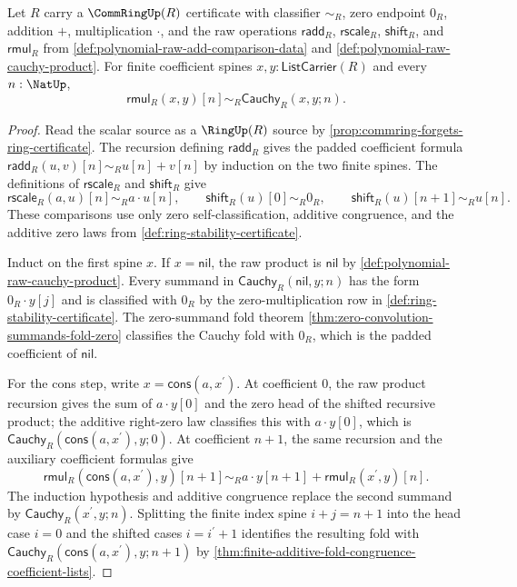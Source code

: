 \begin{lemma}
\label{lem:raw-cauchy-product-coefficient-formula}
Let $R$ carry a $\CommRingUp(R)$ certificate with classifier $\sim_R$, zero endpoint $0_R$, addition $+$, multiplication $\cdot$, and the raw operations $\mathsf{radd}_R$, $\mathsf{rscale}_R$, $\mathsf{shift}_R$, and $\mathsf{rmul}_R$ from \autoref{def:polynomial-raw-add-comparison-data} and \autoref{def:polynomial-raw-cauchy-product}. For finite coefficient spines $x,y:\mathsf{ListCarrier}(R)$ and every $n:\NatUp$,
$$
\mathsf{rmul}_R(x,y)[n]\sim_R\mathsf{Cauchy}_R(x,y;n).
$$
\end{lemma}
\begin{proof}
Read the scalar source as a $\RingUp(R)$ source by \autoref{prop:commring-forgets-ring-certificate}. The recursion defining $\mathsf{radd}_R$ gives the padded coefficient formula $\mathsf{radd}_R(u,v)[n]\sim_Ru[n]+v[n]$ by induction on the two finite spines. The definitions of $\mathsf{rscale}_R$ and $\mathsf{shift}_R$ give
$$
\mathsf{rscale}_R(a,u)[n]\sim_Ra\cdot u[n],\qquad \mathsf{shift}_R(u)[0]\sim_R0_R,\qquad \mathsf{shift}_R(u)[n+1]\sim_Ru[n].
$$
These comparisons use only zero self-classification, additive congruence, and the additive zero laws from \autoref{def:ring-stability-certificate}.

Induct on the first spine $x$. If $x=\mathsf{nil}$, the raw product is $\mathsf{nil}$ by \autoref{def:polynomial-raw-cauchy-product}. Every summand in $\mathsf{Cauchy}_R(\mathsf{nil},y;n)$ has the form $0_R\cdot y[j]$ and is classified with $0_R$ by the zero-multiplication row in \autoref{def:ring-stability-certificate}. The zero-summand fold theorem \autoref{thm:zero-convolution-summands-fold-zero} classifies the Cauchy fold with $0_R$, which is the padded coefficient of $\mathsf{nil}$.

For the cons step, write $x=\mathsf{cons}(a,x^{\prime})$. At coefficient $0$, the raw product recursion gives the sum of $a\cdot y[0]$ and the zero head of the shifted recursive product; the additive right-zero law classifies this with $a\cdot y[0]$, which is $\mathsf{Cauchy}_R(\mathsf{cons}(a,x^{\prime}),y;0)$. At coefficient $n+1$, the same recursion and the auxiliary coefficient formulas give
$$
\mathsf{rmul}_R(\mathsf{cons}(a,x^{\prime}),y)[n+1]\sim_R a\cdot y[n+1]+\mathsf{rmul}_R(x^{\prime},y)[n].
$$
The induction hypothesis and additive congruence replace the second summand by $\mathsf{Cauchy}_R(x^{\prime},y;n)$. Splitting the finite index spine $i+j=n+1$ into the head case $i=0$ and the shifted cases $i=i^{\prime}+1$ identifies the resulting fold with $\mathsf{Cauchy}_R(\mathsf{cons}(a,x^{\prime}),y;n+1)$ by \autoref{thm:finite-additive-fold-congruence-coefficient-lists}.
\end{proof}

